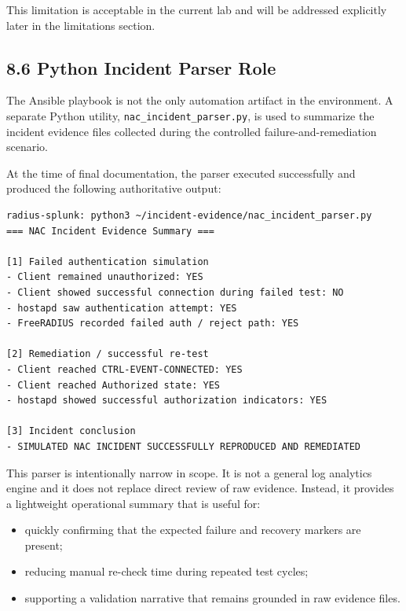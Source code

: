 \documentclass[11pt]{article}
\begin{document}
This limitation is acceptable in the current lab and will be addressed explicitly later in the limitations section.


\subsection{8.6 Python Incident Parser Role}
\label{sec:python-incident-parser-role}

The Ansible playbook is not the only automation artifact in the environment. A separate Python utility, \texttt{nac\_incident\_parser.py}, is used to summarize the incident evidence files collected during the controlled failure-and-remediation scenario.

At the time of final documentation, the parser executed successfully and produced the following authoritative output:

\begin{verbatim}
radius-splunk: python3 ~/incident-evidence/nac_incident_parser.py
=== NAC Incident Evidence Summary ===

[1] Failed authentication simulation
- Client remained unauthorized: YES
- Client showed successful connection during failed test: NO
- hostapd saw authentication attempt: YES
- FreeRADIUS recorded failed auth / reject path: YES

[2] Remediation / successful re-test
- Client reached CTRL-EVENT-CONNECTED: YES
- Client reached Authorized state: YES
- hostapd showed successful authorization indicators: YES

[3] Incident conclusion
- SIMULATED NAC INCIDENT SUCCESSFULLY REPRODUCED AND REMEDIATED
\end{verbatim}

This parser is intentionally narrow in scope. It is not a general log analytics engine and it does not replace direct review of raw evidence. Instead, it provides a lightweight operational summary that is useful for:

\begin{itemize}
    \item quickly confirming that the expected failure and recovery markers are present;
    \item reducing manual re-check time during repeated test cycles;
    \item supporting a validation narrative that remains grounded in raw evidence files.
\end{itemize}
\end{document}
